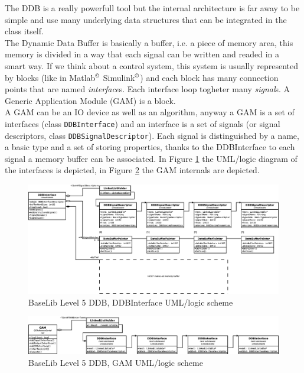 The DDB is a really powerfull tool but the internal architecture is far away to be simple and use many underlying data structures that can be integrated in the class itself. \\


The Dynamic Data Buffer is basically a buffer, i.e. a piece of memory area, this memory is divided in a way that each signal can be written and readed in a smart way. If we think about a control system, this system is usually represented by blocks (like in Matlab$^\copyright$ Simulink$^\copyright$) and each block has many connection points that are named \textit{interface}s. Each interface loop togheter many \textit{signal}s. A Generic Application Module (GAM) is a block. \\


A GAM can be an IO device as well as an algorithm, anyway a GAM is a set of interfaces (class \texttt{DDBInterface}) and an interface is a set of signals (or signal descriptors, class \texttt{DDBSignalDescriptor}). Each signal is distinguished by a name, a basic type and a set of storing properties, thanks to the DDBInterface to each signal a memory buffer can be associated. In Figure \ref{f:level5:DDB:DDBInterface_logic} the UML/logic diagram of the interfaces is depicted, in Figure \ref{f:level5:DDB:GAM_logic} the GAM internals are depicted.

\begin{figure}[h!]
 \begin{center}
  \includegraphics[width=\textwidth]{level5/DDBInterface_logic.eps}
  \caption{BaseLib Level 5 DDB, DDBInterface UML/logic scheme}
  \label{f:level5:DDB:DDBInterface_logic}
 \end{center}
\end{figure}
\begin{figure}[h!]
 \begin{center}
  \includegraphics[width=\textwidth]{level5/GAM_logic.eps}
  \caption{BaseLib Level 5 DDB, GAM UML/logic scheme}
  \label{f:level5:DDB:GAM_logic}
 \end{center}
\end{figure}


